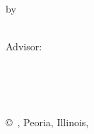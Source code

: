 \pagestyle{empty}

\begin{titlepage}
        \begin{center}
        \vspace*{1.0cm}

        \Huge
        {\bf \thesistitlecoverpage }

        \vspace*{1.0cm}

        \normalsize
        by \\

        \vspace*{1.0cm}

        \Large
        \thesisauthor\\
        Advisor:~\href{http://personalpages.bradley.edu/~smiah/}{\advisor}\\

        \vspace*{3.0cm}


        \vspace*{2.0cm}

        \nameofprogram\\
        \academicunit\\
        \nameOfUniversity\\

        \vspace*{4.0cm}

        \copyright~\thesisauthor, Peoria, Illinois, \graduationyear\\
        \end{center}
\end{titlepage}


\pagestyle{plain}
\setcounter{page}{2}

\cleardoublepage %




